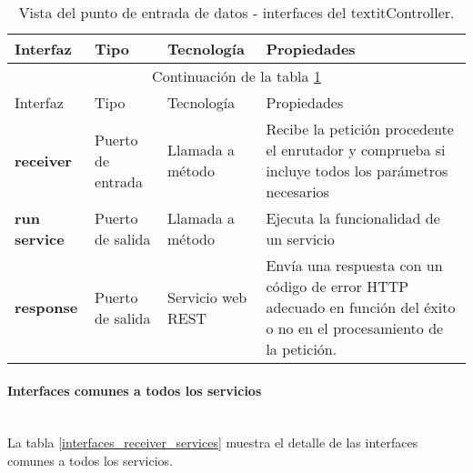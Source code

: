 \begin{longtable}[c]{|p{25mm}|p{20mm}|p{30mm}|p{60mm}|}
 \caption{Vista del punto de entrada de datos - interfaces del textit{Controller}.\label{interfaces_receiver_controller}}\\
 \hline
 	Interfaz & Tipo & Tecnología & Propiedades\\
 \hline
 \hline
 \endfirsthead
 \hline
 \multicolumn{4}{|c|}{Continuación de la tabla \ref{interfaces_receiver_controller}}\\
 \hline
 	Interfaz & Tipo & Tecnología & Propiedades\\
 \hline
 \hline
 \endhead
 \hline
 \endfoot
 	
 	\textbf{receiver} & Puerto de entrada & Llamada a método & Recibe la petición procedente el enrutador y comprueba si incluye todos los parámetros necesarios \\
 	\hline
 	
 	\textbf{run service} & Puerto de salida & Llamada a método & Ejecuta la funcionalidad de un servicio \\
 	\hline
 	
 	\textbf{response} & Puerto de salida & Servicio web REST & Envía una respuesta con un código de error HTTP adecuado en función del éxito o no en el procesamiento de la petición. \\
\hline
\hline
 
\end{longtable}


\paragraph{Interfaces comunes a todos los servicios} \hfill \\
La tabla \ref{interfaces_receiver_services} muestra el detalle de las interfaces comunes a todos los servicios.

